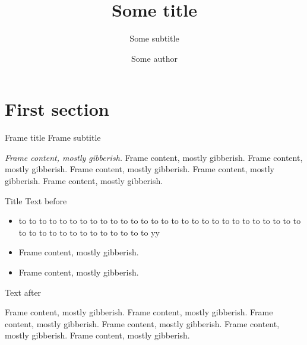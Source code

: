\documentclass[9pt]{beamer}
\begin{document}
\title{Some title}
\subtitle{Some subtitle}

\author{Some author}

\maketitle


\section{First section}

\begin{frame}
  {Frame title}
  {Frame subtitle}

  \begingroup
    \emph{Frame content, mostly gibberish.} Frame content, mostly
    gibberish. Frame content, mostly gibberish. Frame content, mostly
    gibberish. Frame content, mostly gibberish. Frame content, mostly
    gibberish.
  \endgroup

  \vskip10pt
  \begin{alertblock}{Title}
    Text before
    \begin{itemize}
    \item to to to to to to to to to to to to to to to to to to to to to
      to to to to to to to to to to to to to to to to to to to to yy
    \item Frame content, mostly gibberish.
    \item Frame content, mostly gibberish.
    \end{itemize}
    Text after
  \end{alertblock}

  \vskip10pt%
  \begin{framedtext}%
    [offset=8pt, tikzoptions={draw=darkorange, very thick,
                              rounded corners=2pt}]%
    Frame content, mostly gibberish. Frame content, mostly gibberish.
    Frame content, mostly gibberish. Frame content, mostly gibberish.
    Frame content, mostly gibberish. Frame content, mostly gibberish.
  \end{framedtext}

  \vskip10pt
  \begin{center}
    \leavevmode
    \hfil
  \end{center}

\end{frame}
\end{document}
